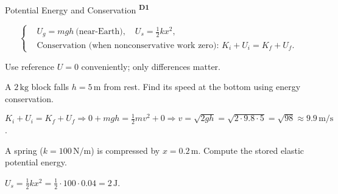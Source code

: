 ﻿\documentclass[12pt,a4paper]{article}
\providecommand{\KPFormulas}{}
\providecommand{\KPHeuristics}{}
\providecommand{\KPProblems}{}
\newcommand{\DOne}{\texorpdfstring{\textsuperscript{\textbf{D1}}}{ D1}}
\begin{document}
\begin{KnowledgePoint}{Potential Energy and Conservation \DOne}
  \KPFormulas
\begin{formulabox}
  \[
  \left\{\begin{aligned}
    &U_g=mgh\ \text{(near-Earth)},\quad U_s=\tfrac12 kx^2,\\
    &\text{Conservation (when nonconservative work zero): }K_i+U_i=K_f+U_f.
  \end{aligned}\right.
  \]
  \end{formulabox}

  \KPHeuristics
  \begin{heuristicsbox}
  Use reference $U=0$ conveniently; only differences matter.
  \end{heuristicsbox}

  \KPProblems
\begin{cheatproblem}
  A $2\,\text{kg}$ block falls $h=5\,\text{m}$ from rest. Find its speed at the bottom using energy conservation.
\begin{solutionbox}
  $K_i+U_i=K_f+U_f\Rightarrow0+mgh=\tfrac12mv^2+0\Rightarrow v=\sqrt{2gh}=\sqrt{2\cdot9.8\cdot5}=\sqrt{98}\approx9.9\,\text{m/s}$.
\end{solutionbox}
\end{cheatproblem}
\begin{cheatproblem}
  A spring ($k=100\,\text{N/m}$) is compressed by $x=0.2\,\text{m}$. Compute the stored elastic potential energy.
\begin{solutionbox}
  $U_s=\tfrac12 kx^2=\tfrac12\cdot100\cdot0.04=2\,\text{J}$.
\end{solutionbox}
\end{cheatproblem}
\end{KnowledgePoint}
\end{document}
